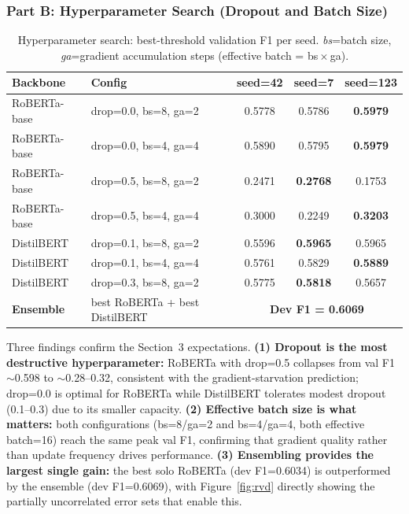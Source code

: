 \documentclass[11pt]{article}
\begin{document}
\subsubsection*{Part B: Hyperparameter Search (Dropout and Batch Size)}

\begin{table}[H]
\centering
\begin{tabular}{llccc}
\toprule
Backbone & Config & seed=42 & seed=7 & seed=123 \\
\midrule
RoBERTa-base & drop=0.0, bs=8, ga=2  & 0.5778 & 0.5786 & \textbf{0.5979} \\
RoBERTa-base & drop=0.0, bs=4, ga=4  & 0.5890 & 0.5795 & \textbf{0.5979} \\
RoBERTa-base & drop=0.5, bs=8, ga=2  & 0.2471 & \textbf{0.2768} & 0.1753 \\
RoBERTa-base & drop=0.5, bs=4, ga=4  & 0.3000 & 0.2249 & \textbf{0.3203} \\
\midrule
DistilBERT   & drop=0.1, bs=8, ga=2  & 0.5596 & \textbf{0.5965} & 0.5965 \\
DistilBERT   & drop=0.1, bs=4, ga=4  & 0.5761 & 0.5829 & \textbf{0.5889} \\
DistilBERT   & drop=0.3, bs=8, ga=2  & 0.5775 & \textbf{0.5818} & 0.5657 \\
\midrule
\textbf{Ensemble} & best RoBERTa + best DistilBERT & \multicolumn{3}{c}{\textbf{Dev F1 = 0.6069}} \\
\bottomrule
\end{tabular}
\caption{Hyperparameter search: best-threshold validation F1 per seed. \textit{bs}=batch size, \textit{ga}=gradient accumulation steps (effective batch = bs\,$\times$\,ga).}
\label{tab:ablation_dropout}
\end{table}

Three findings confirm the Section~3 expectations. \textbf{(1) Dropout is the most destructive hyperparameter:} RoBERTa with drop=0.5 collapses from val F1~$\sim$0.598 to $\sim$0.28--0.32, consistent with the gradient-starvation prediction; drop=0.0 is optimal for RoBERTa while DistilBERT tolerates modest dropout (0.1--0.3) due to its smaller capacity. \textbf{(2) Effective batch size is what matters:} both configurations (bs=8/ga=2 and bs=4/ga=4, both effective batch=16) reach the same peak val F1, confirming that gradient quality rather than update frequency drives performance. \textbf{(3) Ensembling provides the largest single gain:} the best solo RoBERTa (dev F1=0.6034) is outperformed by the ensemble (dev F1=0.6069), with Figure~\ref{fig:rvd} directly showing the partially uncorrelated error sets that enable this.
\end{document}
